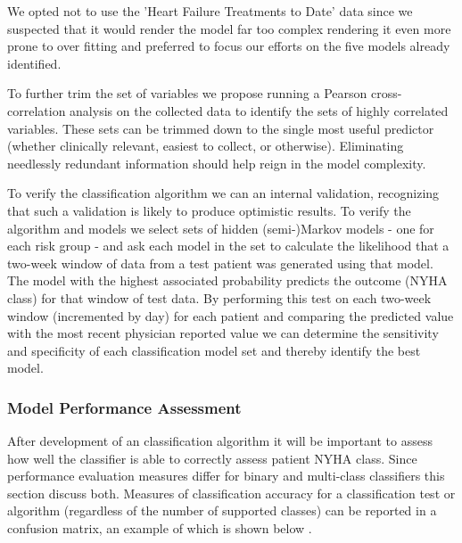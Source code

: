\documentclass[]{article}
\begin{document}
We opted not to use the 'Heart Failure Treatments to Date' data since we suspected that it would render the model far too complex rendering it even more prone to over fitting and preferred to focus our efforts on the five models already identified.

To further trim the set of variables we propose running a Pearson cross-correlation analysis on the collected data to identify the sets of highly correlated variables. These sets can be trimmed down to the single most useful predictor (whether clinically relevant, easiest to collect, or otherwise). Eliminating needlessly redundant information should help reign in the model complexity.

To verify the classification algorithm we can an internal validation, recognizing that such a validation is likely to produce optimistic results. To verify the algorithm and models we select sets of hidden (semi-)Markov models - one for each risk group - and ask each model in the set to calculate the likelihood that a two-week window of data from a test patient was generated using that model. The model with the highest associated probability predicts the outcome (NYHA class) for that window of test data. By performing this test on each two-week window (incremented by day) for each patient and comparing the predicted value with the most recent physician reported value we can determine the sensitivity and specificity of each classification model set and thereby identify the best model.


\subsubsection{Model Performance Assessment}

After development of an classification algorithm it will be important to assess how well the classifier is able to correctly assess patient NYHA class. Since performance evaluation measures differ for binary and multi-class classifiers this section discuss both. Measures of classification accuracy for a classification test or algorithm (regardless of the number of supported classes) can be reported in a confusion matrix, an example of which is shown below \cite{Sayad,MedCalc2017,Davis2006,Flach2004}.
\end{document}
